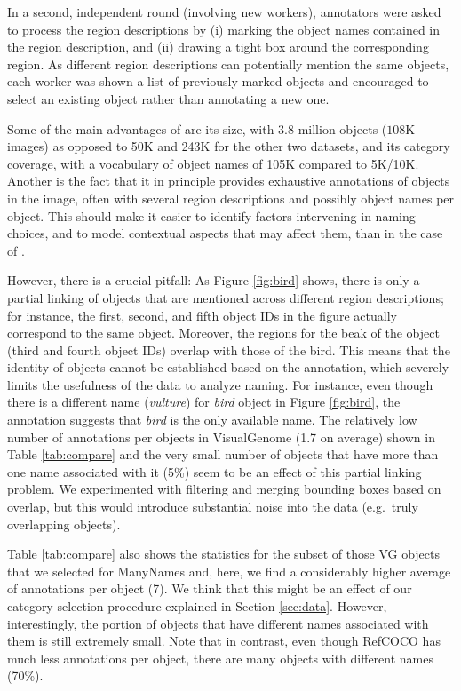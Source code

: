 In a second, independent round (involving new workers), annotators were asked to process the region descriptions by (i) marking the object names contained in the region description, and (ii) drawing a tight box around the corresponding region. As different region descriptions can potentially mention the same objects, each worker was shown a list of previously marked objects and encouraged to select an existing object rather than annotating a new one.


Some of the main advantages of \vg are its size, with 3.8 million objects ($108$K images) as opposed to 50K and 243K for the other two datasets, and its category coverage, with a vocabulary of object names of 105K compared to 5K/10K.
Another is the fact that it in principle provides exhaustive annotations of objects in the image, often with several region descriptions and possibly object names per object.
This should make it easier to identify factors intervening in naming choices, and to model contextual aspects that may affect them, than in the case of .

However, there is a crucial pitfall: As Figure \ref{fig:bird} shows, there is only a partial linking of objects that are mentioned across different region descriptions; for instance, the first, second, and fifth object IDs in the figure actually correspond to the same object.
Moreover, the regions for the beak of the object (third and fourth object IDs) overlap with those of the bird.
This means that the identity of objects cannot be established based on the annotation, which severely limits the usefulness of the data to analyze naming.
For instance, even though there is a different name (\textit{vulture}) for \textit{bird} object in Figure \ref{fig:bird}, the annotation suggests that \textit{bird} is the only available name. 
The relatively low number of annotations per objects in VisualGenome (1.7 on average) shown in Table \ref{tab:compare} and the very small number of objects that have more than one name associated with it (5\%) seem to be an effect of this partial linking problem.
We experimented with filtering and merging bounding boxes based on overlap, but this would introduce substantial noise into the data (e.g.\ truly overlapping objects).

Table \ref{tab:compare} also shows the statistics for the subset of those VG objects that we selected for ManyNames and, here, we find a considerably higher average of annotations per object (7). 
We think that this might be an effect of our category selection procedure explained in Section \ref{sec:data}. However, interestingly, the portion of objects that have different names associated with them is still extremely small.
Note that in contrast, even though RefCOCO has much less annotations per object, there are many objects with different names (70\%).


